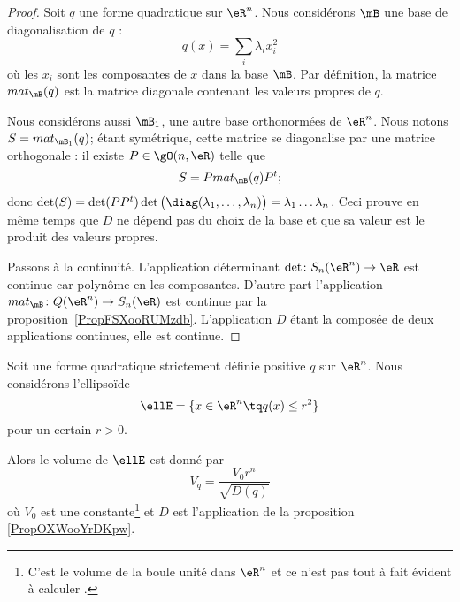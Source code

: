 \begin{proof}
	Soit \( q\) une forme quadratique sur \( \eR^n\). Nous considérons \( \mB\) une base de diagonalisation de \( q\) :
	\begin{equation}
		q(x)=\sum_i\lambda_ix_i^2
	\end{equation}
	où les \( x_i\) sont les composantes de \( x\) dans la base \( \mB\). Par définition, la matrice \( mat_{\mB}(q)\) est la matrice diagonale contenant les valeurs propres de \( q\).

	Nous considérons aussi \( \mB_1\), une autre base orthonormées de \( \eR^n\). Nous notons \( S=mat_{\mB_1}(q)\); étant symétrique, cette matrice se diagonalise par une matrice orthogonale : il existe \( P\in\gO(n,\eR)\) telle que
	\begin{equation}
		S=P mat_{\mB}(q)P^t;
	\end{equation}
	donc \( \det(S)=\det(PP^t)\det\big( \diag(\lambda_1,\ldots, \lambda_n) \big)=\lambda_1\ldots\lambda_n\). Ceci prouve en même temps que \( D\) ne dépend pas du choix de la base et que sa valeur est le produit des valeurs propres.

	Passons à la continuité. L'application déterminant \( \det\colon S_n(\eR^n)\to \eR\) est continue car polynôme en les composantes. D'autre part l'application \( mat_{\mB}\colon Q(\eR^n)\to S_n(\eR)\) est continue par la proposition~\ref{PropFSXooRUMzdb}. L'application  \( D\) étant la composée de deux applications continues, elle est continue.
\end{proof}

\begin{lemma}       \label{LEMooLSTOooZiEOdx}
	Soit une forme quadratique strictement définie positive \( q\) sur \( \eR^n\). Nous considérons l'ellipsoïde
	\begin{equation}
		\ellE=\{ x\in \eR^n\tq q(x)\leq r^2 \}
	\end{equation}
	pour un certain \( r>0\).

	Alors le volume de \( \ellE\) est donné par
	\begin{equation}
		V_q=\frac{ V_0 r^n }{ \sqrt{ D(q) } }
	\end{equation}
	où \( V_0\) est une constante\footnote{C'est le volume de la boule unité dans \( \eR^n\) et ce n'est pas tout à fait évident à calculer \cite{ooVLVAooXWmUVB}.} et \( D\) est l'application de la proposition \ref{PropOXWooYrDKpw}.
\end{lemma}

